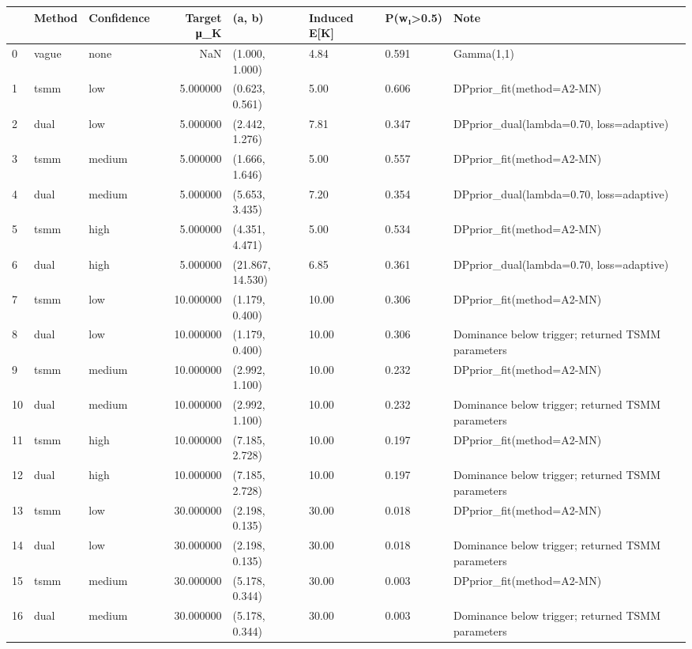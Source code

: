 \begin{tabular}{lllrllll}
\toprule
 & Method & Confidence & Target μ_K & (a, b) & Induced E[K] & P(w₁>0.5) & Note \\
\midrule
0 & vague & none & NaN & (1.000, 1.000) & 4.84 & 0.591 & Gamma(1,1) \\
1 & tsmm & low & 5.000000 & (0.623, 0.561) & 5.00 & 0.606 & DPprior_fit(method=A2-MN) \\
2 & dual & low & 5.000000 & (2.442, 1.276) & 7.81 & 0.347 & DPprior_dual(lambda=0.70, loss=adaptive) \\
3 & tsmm & medium & 5.000000 & (1.666, 1.646) & 5.00 & 0.557 & DPprior_fit(method=A2-MN) \\
4 & dual & medium & 5.000000 & (5.653, 3.435) & 7.20 & 0.354 & DPprior_dual(lambda=0.70, loss=adaptive) \\
5 & tsmm & high & 5.000000 & (4.351, 4.471) & 5.00 & 0.534 & DPprior_fit(method=A2-MN) \\
6 & dual & high & 5.000000 & (21.867, 14.530) & 6.85 & 0.361 & DPprior_dual(lambda=0.70, loss=adaptive) \\
7 & tsmm & low & 10.000000 & (1.179, 0.400) & 10.00 & 0.306 & DPprior_fit(method=A2-MN) \\
8 & dual & low & 10.000000 & (1.179, 0.400) & 10.00 & 0.306 & Dominance below trigger; returned TSMM parameters \\
9 & tsmm & medium & 10.000000 & (2.992, 1.100) & 10.00 & 0.232 & DPprior_fit(method=A2-MN) \\
10 & dual & medium & 10.000000 & (2.992, 1.100) & 10.00 & 0.232 & Dominance below trigger; returned TSMM parameters \\
11 & tsmm & high & 10.000000 & (7.185, 2.728) & 10.00 & 0.197 & DPprior_fit(method=A2-MN) \\
12 & dual & high & 10.000000 & (7.185, 2.728) & 10.00 & 0.197 & Dominance below trigger; returned TSMM parameters \\
13 & tsmm & low & 30.000000 & (2.198, 0.135) & 30.00 & 0.018 & DPprior_fit(method=A2-MN) \\
14 & dual & low & 30.000000 & (2.198, 0.135) & 30.00 & 0.018 & Dominance below trigger; returned TSMM parameters \\
15 & tsmm & medium & 30.000000 & (5.178, 0.344) & 30.00 & 0.003 & DPprior_fit(method=A2-MN) \\
16 & dual & medium & 30.000000 & (5.178, 0.344) & 30.00 & 0.003 & Dominance below trigger; returned TSMM parameters \\

\end{tabular}
